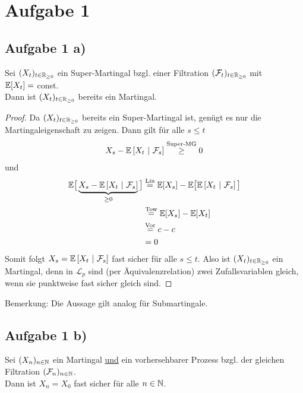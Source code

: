 \documentclass[12pt,a4paper]{article}
\author{Willi Sontopski}
\begin{document}

\section*{Aufgabe 1}
\subsection*{Aufgabe 1 a)}
Sei $(X_t)_{t\in\mathbb{R}_{\geq0}}$ ein Super-Martingal bzgl. einer Filtration $(\mathcal{F}_t)_{t\in\mathbb{R}_{\geq0}}$ mit\\ $\mathbb{E}[X_t]=$ const.\\
Dann ist $(X_t)_{t\in\mathbb{R}_{\geq0}}$ bereits ein Martingal.

\begin{proof}
Da $(X_t)_{t\in\mathbb{R}_{\geq0}}$ bereits ein Super-Martingal ist, genügt es nur die Martingaleigenschaft zu zeigen. Dann gilt für alle $s\leq t$
	\begin{align*}
		X_s - \mathbb{E}\left[{X_t}~|~{\mathcal{F}_s}\right] \stackrel{\text{Super-MG}}{\geq} 0
	\end{align*}
	und
	\begin{align*}
		\mathbb{E}\big[\underbrace{X_s - \mathbb{E}\left[{X_t}~|~{\mathcal{F}_s}\right]}_{\geq0} \big]
		&\stackrel{\text{Lin}}{=} \mathbb{E}[X_s] - \mathbb{E}\big[\mathbb{E}\left[{X_t}~|~{\mathcal{F}_s}\right] \big] \\		
		&\stackrel{\text{Tow}}{=} \mathbb{E}[X_s] - \mathbb{E}[X_t] \\
		&\stackrel{\text{Vor}}{=} c-c \\
		&= 0
	\end{align*}
Somit folgt $X_s=\mathbb{E}\left[{X_t}~|~{\mathcal{F}_s}\right]$ fast sicher für alle $s\leq t$. Also ist $(X_t)_{t\in\mathbb{R}_{\geq0}}$ ein Martingal, denn in $\mathcal{L}_p$ sind (per Äquivalenzrelation) zwei Zufallsvariablen gleich, wenn sie punktweise fast sicher gleich sind.
\end{proof}

Bemerkung: Die Aussage gilt analog für Submartingale.

\subsection*{Aufgabe 1 b)}
Sei $(X_n)_{n\in\mathbb{N}}$ ein Martingal \underline{und} ein vorhersehbarer Prozess bzgl. der gleichen Filtration $(\mathcal{F}_n)_{n\in\mathbb{N}}$.\\
Dann ist $X_n=X_0$ fast sicher für alle $n\in\mathbb{N}$.
\end{document}
